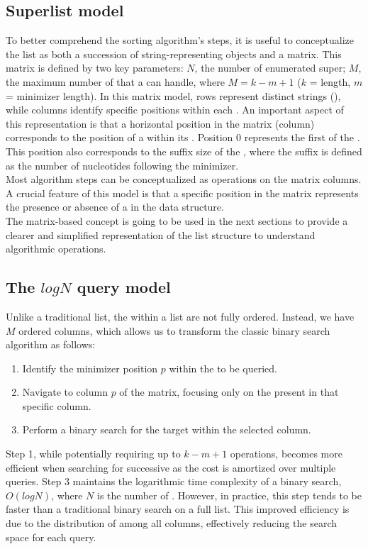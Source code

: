\subsection{Super\kmer list model}
\label{sec:skmer_model}
To better comprehend the sorting algorithm's steps, it is useful to conceptualize the \skmer list as both a succession of string-representing objects and a matrix. This matrix is defined by two key parameters: $N$, the number of enumerated super\kmers; $M$, the maximum number of \kmers that a \skmer can handle, where $M = k-m+1$ ($k$ = \kmer length, $m$ = minimizer length). In this matrix model, rows represent distinct strings (\skmers), while columns identify specific positions within each \skmer. An important aspect of this representation is that a horizontal position in the matrix (column) corresponds to the position of a \kmer within its \skmer. Position 0 represents the first \kmer of the \skmer. This position also corresponds to the suffix size of the \kmer, where the suffix is defined as the number of nucleotides following the minimizer.\\
Most algorithm steps can be conceptualized as operations on the matrix columns. A crucial feature of this model is that a specific position in the matrix represents the presence or absence of a \kmer in the data structure.\\
The matrix-based concept is going to be used in the next sections to provide a clearer and simplified representation of the \skmer list structure to understand algorithmic operations.

\subsection{The $log{N}$ query model}
Unlike a traditional \kmer list, the \kmers within a \skmer list are not fully ordered. Instead, we have $M$ ordered columns, which allows us to transform the classic binary search algorithm as follows:
\begin{enumerate}
	\item Identify the minimizer position $p$ within the \kmer to be queried.
	\item Navigate to column $p$ of the matrix, focusing only on the \kmers present in that specific column.
	\item Perform a binary search for the target \kmer within the selected column.
\end{enumerate}
Step 1, while potentially requiring up to $k-m+1$ operations, becomes more efficient when searching for successive \kmers as the cost is amortized over multiple queries.
Step 3 maintains the logarithmic time complexity of a binary search, $O(log N)$, where $N$ is the number of \skmers. However, in practice, this step tends to be faster than a traditional binary search on a full \kmer list. This improved efficiency is due to the distribution of \kmers among all columns, effectively reducing the search space for each query.

